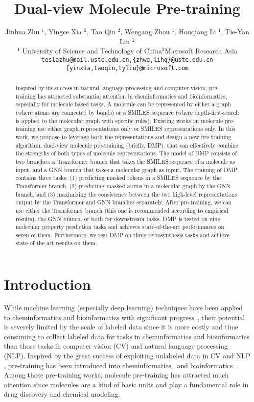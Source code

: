 \documentclass{article}
\title{Dual-view Molecule Pre-training}
\author{Jinhua Zhu $^1$, Yingce Xia $^2$, Tao Qin $^2$, Wengang Zhou $^1$, Houqiang Li $^1$, Tie{-}Yan Liu $^2$\\
  $^1$ University of Science and Technology of China\quad$^2$Microsoft Research Asia\\
  \texttt{teslazhu@mail.ustc.edu.cn,\;\{zhwg,lihq\}@ustc.edu.cn} \\
  \texttt{\{yinxia,taoqin,tyliu\}@microsoft.com}
}
\newcommand{\ourM}{DMP}
\begin{document}
\maketitle

\begin{abstract}
Inspired by its success in natural language processing and computer vision, pre-training has attracted substantial attention in cheminformatics and bioinformatics, especially for molecule based tasks. A molecule can be represented by either a graph (where atoms are connected by bonds) or a SMILES sequence (where depth-first-search is applied to the molecular graph with specific rules). Existing works on molecule pre-training use either graph representations only or SMILES representations only. In this work, we propose to leverage both the representations and design a new pre-training algorithm, dual-view molecule pre-training (briefly, \ourM{}), that can effectively combine the strengths of both types of molecule representations. The model of \ourM{} consists of two branches: a Transformer branch that takes the SMILES sequence of a molecule as input, and a GNN branch that takes a molecular graph as input. The training of \ourM{} contains three tasks: (1) predicting masked tokens in a SMILES sequence by the Transformer branch, (2) predicting masked atoms in a molecular graph by the GNN branch, and (3) maximizing the consistency between the two high-level representations output by the Transformer and GNN branches separately. After pre-training, we can use either the Transformer branch (this one is recommended according to empirical results), the GNN branch, or both for downstream tasks. \ourM{} is tested on nine molecular property prediction tasks and achieves state-of-the-art performances on seven of them. Furthermore, we test \ourM{} on three retrosynthesis tasks and achieve state-of-the-art results on them. 
\end{abstract}

\section{Introduction}
While machine learning (especially deep learning) techniques have been applied to cheminformatics and bioinformatics with significant progress~\cite{huang2016communication,david2020molecular}, their potential is severely limited by the scale of labeled data since it is more costly and time consuming to collect labeled data for tasks in cheminformatics and bioinformatics than those tasks in computer vision (CV) and natural language processing (NLP). Inspired by the great success of exploiting unlabeled data in CV and NLP  \cite{he2020momentum,grill2020bootstrap}, pre-training has been introduced into cheminformatics~\cite{hu2019strategies,chithrananda2020chemberta,wang2021molclr} and bioinformatics~\cite{rao2019evaluating,ESMpaper}. Among those  pre-training works, molecule pre-training has attracted much attention since molecules are a kind of basic units and play a fundamental  role in drug discovery and chemical modeling.
\end{document}
